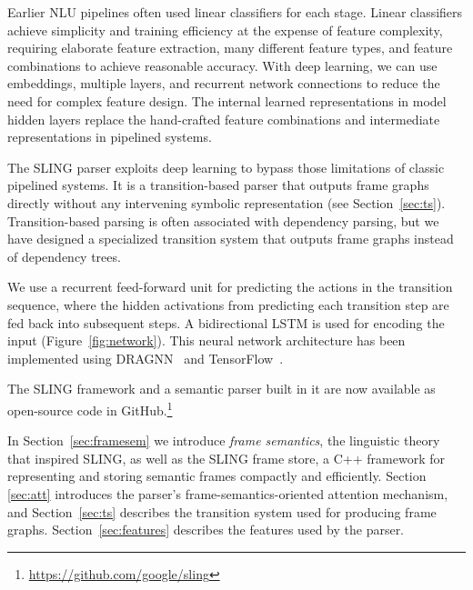 \documentclass[11pt,a4paper]{article}
\begin{document}
Earlier NLU pipelines often used linear classifiers for each stage.
Linear classifiers achieve simplicity and training efficiency at the expense of
feature complexity, requiring elaborate feature
extraction, many different feature types, and 
feature combinations to achieve reasonable accuracy.
With deep learning, we can use embeddings, multiple layers, and recurrent
network connections to reduce the need for complex
feature design. The internal learned representations in model hidden layers
replace the hand-crafted feature combinations and intermediate representations
in pipelined systems.


The SLING parser exploits deep learning to bypass those limitations of classic pipelined systems.
It is a transition-based parser that outputs frame graphs directly without any
intervening symbolic representation (see Section~\ref{sec:ts}). Transition-based
parsing is often associated with dependency parsing, but we have designed a
specialized transition system that outputs frame graphs instead of dependency
trees.

We use a recurrent feed-forward unit for predicting the actions in the
transition sequence, where the hidden activations from predicting each
transition step are fed back into subsequent steps.
A bidirectional LSTM is used for encoding the input (Figure~\ref{fig:network}).
This neural network architecture has been implemented using DRAGNN~\cite{dragnn}
and TensorFlow~\cite{tensorflow}.

The SLING framework and a semantic parser built in it are now available as open-source code in GitHub.\footnote{\url{https://github.com/google/sling}}

In Section~\ref{sec:framesem} we introduce \emph{frame semantics}, the linguistic theory that
inspired SLING, as well as the SLING frame store, a
C++ framework for representing and storing semantic frames compactly and
efficiently.
Section \ref{sec:att} introduces the parser's frame-semantics-oriented attention mechanism, and
Section~\ref{sec:ts} describes the transition system used for producing
frame graphs. Section~\ref{sec:features} describes the features used by the
parser.

\begin{figure*}[t]
  \centering
  
  \caption{Neural network architecture of the SLING parser. The input is encoded by
  a bi-directional LSTM and fed into a recurrent
  feed-forward (FF) unit that proposes transition system actions.
  The hidden layer activations and the transition system state are combined to create
  the input feature vector for the next step. The FF unit is
  run repeatedly until the transition system has reached a final state.}
  \label{fig:network}
\end{figure*}
\end{document}
